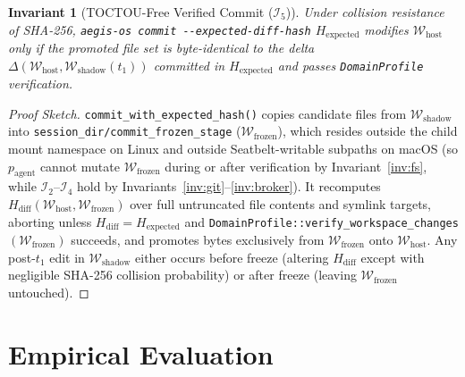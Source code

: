 \documentclass[10pt,journal,compsoc]{IEEEtran}
\newtheorem{invariant}{Invariant}
\begin{document}
\begin{invariant}[TOCTOU-Free Verified Commit ($\mathcal{I}_5$)]
\label{inv:toctou}
Under collision resistance of SHA-256, {\normalfont\texttt{aegis-os commit -\/-expected-diff-hash}} $H_{\text{expected}}$ modifies $\mathcal{W}_{\text{host}}$ only if the promoted file set is byte-identical to the delta $\Delta(\mathcal{W}_{\text{host}}, \mathcal{W}_{\text{shadow}}(t_1))$ committed in $H_{\text{expected}}$ and passes \texttt{DomainProfile} verification.
\end{invariant}
\begin{proof}[Proof Sketch]
\texttt{commit\_\allowbreak with\_\allowbreak expected\_\allowbreak hash()} copies candidate files from $\mathcal{W}_{\text{shadow}}$ into \texttt{session\_dir/\allowbreak commit\_\allowbreak frozen\_\allowbreak stage} ($\mathcal{W}_{\text{frozen}}$), which resides outside the child mount namespace on Linux and outside Seatbelt-writable subpaths on macOS (so $p_{\text{agent}}$ cannot mutate $\mathcal{W}_{\text{frozen}}$ during or after verification by Invariant~\ref{inv:fs}, while $\mathcal{I}_2$--$\mathcal{I}_4$ hold by Invariants~\ref{inv:git}--\ref{inv:broker}). It recomputes $H_{\text{diff}}(\mathcal{W}_{\text{host}}, \mathcal{W}_{\text{frozen}})$ over full untruncated file contents and symlink targets, aborting unless $H_{\text{diff}} = H_{\text{expected}}$ and \texttt{DomainProfile::\allowbreak verify\_\allowbreak workspace\_\allowbreak changes}$(\mathcal{W}_{\text{frozen}})$ succeeds, and promotes bytes exclusively from $\mathcal{W}_{\text{frozen}}$ onto $\mathcal{W}_{\text{host}}$. Any post-$t_1$ edit in $\mathcal{W}_{\text{shadow}}$ either occurs before freeze (altering $H_{\text{diff}}$ except with negligible SHA-256 collision probability) or after freeze (leaving $\mathcal{W}_{\text{frozen}}$ untouched).
\end{proof}

\section{Empirical Evaluation}
\label{sec:eval}
\end{document}
